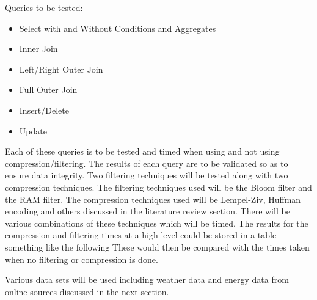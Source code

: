 \documentclass[11pt,journal, a4paper]{IEEEtran}
\begin{document}
Queries to be tested:
	\begin{itemize}
		\item Select with and Without Conditions and Aggregates
        \item Inner Join
        \item Left/Right Outer Join
        \item Full Outer Join
        \item Insert/Delete
        \item Update
	\end{itemize}
Each of these queries is to be tested and timed when using and not using compression/filtering. The results of each query are to be validated so as to ensure data integrity. Two filtering techniques will be tested along with two compression techniques. The filtering techniques used will be the Bloom filter and the RAM filter. The compression techniques used will be Lempel-Ziv, Huffman encoding and others discussed in the literature review section. There will be various combinations of these techniques which will be timed. The results for the compression and filtering times at a high level could be stored in a table something like the following These would then be compared with the times taken when no filtering or compression is done.\\


\begin{table}[H]
\caption{Example table for results of filtering and compression}
\label{table:1}
\centering
{}
\end{table}

\noindent
Various data sets will be used including weather data and energy data from online sources discussed in the next section. 
\end{document}
